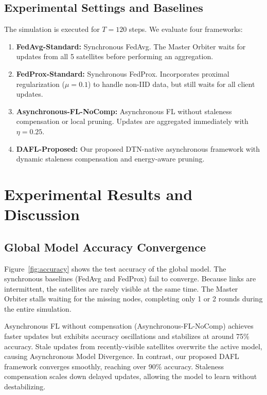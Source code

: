 \documentclass[journal,twocolumn]{IEEEtran}
\newcommand{\dafl}{\textsf{DAFL}}
\newcommand{\fedavg}{\textsf{FedAvg}}
\newcommand{\fedprox}{\textsf{FedProx}}
\begin{document}
\subsection{Experimental Settings and Baselines}
The simulation is executed for $T = 120$ steps. We evaluate four frameworks:
\begin{enumerate}
    \item \textbf{\fedavg{}-Standard:} Synchronous FedAvg. The Master Orbiter waits for updates from all 5 satellites before performing an aggregation.
    \item \textbf{\fedprox{}-Standard:} Synchronous FedProx. Incorporates proximal regularization ($\mu = 0.1$) to handle non-IID data, but still waits for all client updates.
    \item \textbf{Asynchronous-FL-NoComp:} Asynchronous FL without staleness compensation or local pruning. Updates are aggregated immediately with $\eta = 0.25$.
    \item \textbf{\dafl{}-Proposed:} Our proposed DTN-native asynchronous framework with dynamic staleness compensation and energy-aware pruning.
\end{enumerate}

\section{Experimental Results and Discussion}
\label{sec:results}

\subsection{Global Model Accuracy Convergence}
Figure~\ref{fig:accuracy} shows the test accuracy of the global model.
The synchronous baselines (\fedavg{} and \fedprox{}) fail to converge. Because links are intermittent, the satellites are rarely visible at the same time. The Master Orbiter stalls waiting for the missing nodes, completing only 1 or 2 rounds during the entire simulation.

Asynchronous FL without compensation (Asynchronous-FL-NoComp) achieves faster updates but exhibits accuracy oscillations and stabilizes at around 75\% accuracy. Stale updates from recently-visible satellites overwrite the active model, causing Asynchronous Model Divergence.
In contrast, our proposed \dafl{} framework converges smoothly, reaching over 90\% accuracy. Staleness compensation scales down delayed updates, allowing the model to learn without destabilizing.
\end{document}
